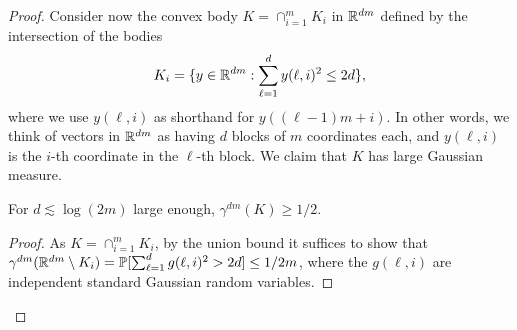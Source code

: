 \begin{proof}
Consider now the convex body  $K = \cap_{i=1}^m K_i$ in $\mathbb{R}^{dm}$ defined by the intersection of the bodies
\[K_i=\{ y\in \mathbb{R}^{dm} :  \sum_{\ell=1}^d y(\ell,i)^2 \leq 2d\},\]
where we use $y(\ell,i)$ as shorthand for $y((\ell-1)m + i)$. In other
words, we think of vectors in $\mathbb{R}^{dm}$ as having $d$ blocks of
$m$ coordinates each, and $y(\ell, i)$ is the $i$-th coordinate in the
$\ell$-th block.
We claim that $K$ has large Gaussian measure.
\begin{claim} 
  For $d \lesssim \log(2m)$ large enough,  $\gamma^{dm} (K) \geq 1/2$.   
\end{claim}
\begin{proof}
  As $K = \cap_{i=1}^m K_i$, by the union bound it suffices to show
  that $\gamma^{dm} (\mathbb{R}^{dm} \setminus K_i ) = \mathbb{P}[ \sum_{\ell=1}^d
  g(\ell,i)^2 > 2 d] \leq 1/2m$,  where the $g(\ell,i)$ are
  independent standard Gaussian random variables.


\end{proof}
\end{proof}
